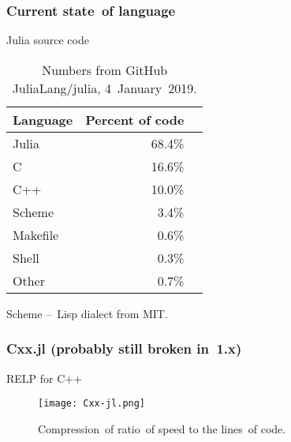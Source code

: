 \documentclass{beamer}  %
\begin{document}
\begin{frame}
  \frametitle{Current state~of language}

  \begin{block}{Julia source code}
    \begin{table}
      \centering
      
      \begin{tabular}{|l|r|r|}
        \hline
        Language & Percent of code \\
        \hline
        Julia & 68.4\% \\
        \hline
        C & 16.6\% \\
        \hline
        C++ & 10.0\% \\
        \hline
        Scheme & 3.4\% \\
        \hline
        Makefile & 0.6\% \\
        \hline
        Shell & 0.3\% \\
        \hline
        Other & 0.7\% \\
        \hline
      \end{tabular}
      \caption{Numbers from GitHub JuliaLang/julia, 4~January~2019.}
    \end{table}
  \end{block}

  \begin{block}{}
    Scheme --~Lisp dialect from
    MIT.%
  \end{block}
  
\end{frame}





\begin{frame}
  \frametitle{Cxx.jl (probably still broken in~1.x)}

  \begin{block}{RELP for C++}
    \begin{figure}
      \centering

      \texttt{[image: Cxx-jl.png]}
      \caption{Compression~of ratio~of speed to the lines~of code.}
    \end{figure}
  \end{block}

\end{frame}
\end{document}
